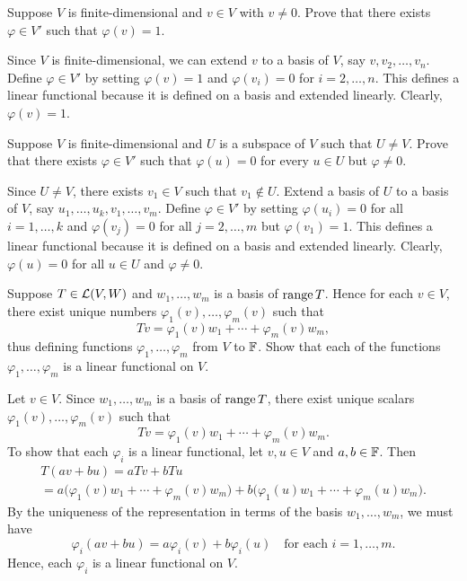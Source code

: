 \begin{exercise}
Suppose $V$ is finite-dimensional and $v\in V$ with $v\ne0$. Prove that there
exists $\varphi\in V'$ such that $\varphi(v)=1$.
\end{exercise}
\begin{solution}
Since $V$ is finite-dimensional, we can extend $v$ to a basis of $V$, say
$v,v_2,\dots,v_n$. Define $\varphi\in V'$ by setting $\varphi(v)=1$ and
$\varphi(v_i)=0$ for $i=2,\dots,n$. This defines a linear functional because it
is defined on a basis and extended linearly. Clearly, $\varphi(v)=1$.
\end{solution}

\begin{exercise}
Suppose $V$ is finite-dimensional and $U$ is a subspace of $V$ such that
$U\ne V$. Prove that there exists $\varphi\in V'$ such that $\varphi(u)=0$ for
every $u\in U$ but $\varphi\ne0$.
\end{exercise}
\begin{solution}
Since $U\ne V$, there exists $v_1\in V$ such that $v_1\notin U$. Extend a basis
of $U$ to a basis of $V$, say $u_1,\dots,u_k,v_1,\dots,v_m$. Define
$\varphi\in V'$ by setting $\varphi(u_i)=0$ for all $i=1,\dots,k$ and
$\varphi(v_j)=0$ for all $j=2,\dots,m$ but $\varphi(v_1)=1$. This defines a
linear functional because it is defined on a basis and extended linearly.
Clearly, $\varphi(u)=0$ for all $u\in U$ and $\varphi\ne0$.
\end{solution}

\begin{exercise}
Suppose $T\in\mathcal{L}(V,W)$ and $w_1,\dots,w_m$ is a basis of $\operatorname{range} T$. Hence for
each $v\in V$, there exist unique numbers $\varphi_1(v),\dots,\varphi_m(v)$ such
that
\[ Tv = \varphi_1(v)w_1+\cdots+\varphi_m(v)w_m, \]
thus defining functions $\varphi_1,\dots,\varphi_m$ from $V$ to $\mathbb{F}$. Show that
each of the functions $\varphi_1,\dots,\varphi_m$ is a linear functional on $V$.
\end{exercise}
\begin{solution}
Let $v\in V$. Since $w_1,\dots,w_m$ is a basis of $\operatorname{range} T$, there exist unique
scalars $\varphi_1(v),\dots,\varphi_m(v)$ such that
\[ Tv = \varphi_1(v)w_1+\cdots+\varphi_m(v)w_m. \]
To show that each $\varphi_i$ is a linear functional, let $v,u\in V$ and
$a,b\in\mathbb{F}$. Then
\begin{multline*}
T(av+bu) = aTv+bTu\\
 = a\bigl(\varphi_1(v)w_1+\cdots+\varphi_m(v)w_m\bigr)
   +b\bigl(\varphi_1(u)w_1+\cdots+\varphi_m(u)w_m\bigr).
\end{multline*}
By the uniqueness of the representation in terms of the basis $w_1,\dots,w_m$,
we must have
\[ \varphi_i(av+bu) = a\varphi_i(v)+b\varphi_i(u) \quad\text{for each }
   i=1,\dots,m. \]
Hence, each $\varphi_i$ is a linear functional on $V$.
\end{solution}

